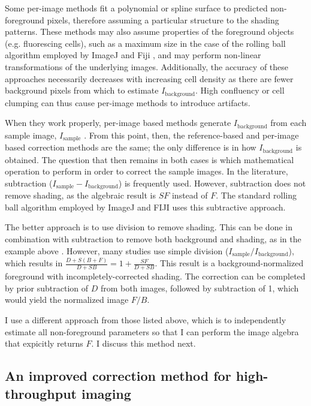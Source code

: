 Some per-image methods fit a polynomial \cite{L2000}
or spline surface \cite{Lindblad162266,Lindblad2004,Yin2013} to predicted
non-foreground pixels, therefore assuming a 
particular structure to the shading patterns.
These methods may also assume properties of 
the foreground objects (e.g. fluorescing cells),
such as a maximum size in the case of the rolling ball algorithm employed by
ImageJ\cite{Schneider2012} and Fiji \cite{Schindelin2012},
and may perform non-linear transformations of the underlying
images. Additionally, the accuracy of these
approaches necessarily decreases with
increasing cell density as there are fewer
background pixels from which to estimate
$I_\text{background}$. High confluency or cell clumping can thus cause
per-image methods to introduce artifacts.


When they work properly, per-image based methods generate
$I_\text{background}$  
from each sample image, $I_\text{sample}$ .
From this point, then, the reference-based and per-image based
correction methods are the same; the only difference is in how
$I_\text{background}$ is obtained.
The question that then remains in both cases is which
mathematical operation to perform in order to correct the sample images. 
In the literature,
subtraction ($I_\text{sample}-I_\text{background}$) is frequently
used. However, subtraction does not remove
shading, as the algebraic result is $SF$ instead of $F$. The standard
rolling ball algorithm employed by ImageJ and
FIJI uses this subtractive approach.


The better approach is to use division to remove shading. This can be
done in combination with subtraction to remove both background and shading,
as in the example above . However, many studies
use simple division ($I_\text{sample}/I_\text{background}$), which results
in $\frac{D+S(B+F)}{D+SB}=1+\frac{SF}{D+SB}$. This result is a
background-normalized foreground with incompletely-corrected shading.
The correction can be completed by prior subtraction of $D$ from both images,
followed by subtraction of 1, which would yield the normalized image $F/B$.


I use a different approach from those listed above, 
which is to independently estimate all
non-foreground parameters so that I can perform the image algebra
that expicitly returns $F$. I discuss this method next.


\subsection{An improved correction method for high-throughput imaging}
\label{imaging:correction:myMethod}


